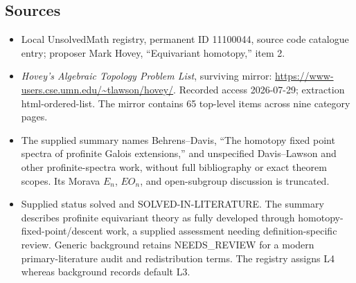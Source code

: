 \documentclass[11pt]{article}
\begin{document}
\subsection{Sources}
\begin{itemize}
\item Local UnsolvedMath registry, permanent ID 11100044, source code catalogue entry; proposer Mark Hovey, ``Equivariant homotopy,'' item 2.
\item \emph{Hovey's Algebraic Topology Problem List}, surviving mirror: \url{https://www-users.cse.umn.edu/~tlawson/hovey/}. Recorded access 2026-07-29; extraction html-ordered-list. The mirror contains 65 top-level items across nine category pages.
\item The supplied summary names Behrens--Davis, ``The homotopy fixed point spectra of profinite Galois extensions,'' and unspecified Davis--Lawson and other profinite-spectra work, without full bibliography or exact theorem scopes. Its Morava \(E_n\), \(EO_n\), and open-subgroup discussion is truncated.
\item Supplied status solved and SOLVED-IN-LITERATURE. The summary describes profinite equivariant theory as fully developed through homotopy-fixed-point/descent work, a supplied assessment needing definition-specific review. Generic background retains NEEDS\_REVIEW for a modern primary-literature audit and redistribution terms. The registry assigns L4 whereas background records default L3.
\end{itemize}
\end{document}
